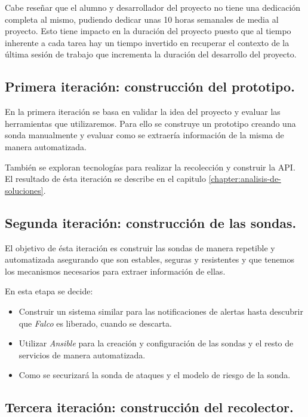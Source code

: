 Cabe reseñar que el alumno y desarrollador del proyecto no tiene una dedicación completa al mismo, pudiendo dedicar unas 10 horas semanales
de media al proyecto. Esto tiene impacto en la duración del proyecto puesto que al tiempo inherente a cada tarea hay un tiempo
invertido en recuperar el contexto de la última sesión de trabajo que incrementa la duración del desarrollo del proyecto.


\subsection{Primera iteración: construcción del prototipo.}

En la primera iteración se basa en validar la idea del proyecto y evaluar las herramientas que utilizaremos. Para ello se construye
un prototipo creando una sonda manualmente y evaluar como se extraería información de la misma de manera automatizada.

También se exploran tecnologías para realizar la recolección y construir la API. El resultado de ésta iteración se describe en
el capitulo \ref{chapter:analisis-de-soluciones}.

\subsection{Segunda iteración: construcción de las sondas.}

El objetivo de ésta iteración es construir las sondas de manera repetible y automatizada asegurando que son estables,
seguras y resistentes y que tenemos los mecanismos necesarios para extraer información de ellas.

En esta etapa se decide:

\begin{itemize}
    \item Construir un sistema similar para las notificaciones de alertas hasta descubrir que \emph{Falco} es liberado, cuando se descarta.
    \item Utilizar \emph{Ansible} para la creación y configuración de las sondas y el resto de servicios de manera automatizada.
    \item Como se securizará la sonda de ataques y el modelo de riesgo de la sonda.
\end{itemize}

\subsection{Tercera iteración: construcción del recolector.}

